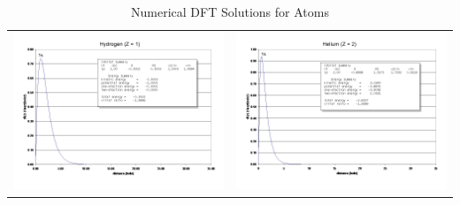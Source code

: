 \documentclass[11pt]{article}
\begin{document}
\begin{table}
   \caption{Numerical DFT Solutions for Atoms }
\begin{tabular}{cc}
\includegraphics[scale=0.33]{Images/Slide1.png} & \includegraphics[scale=0.33]{Images/Slide2.png} \\

\end{tabular}
\end{table}
\end{document}
